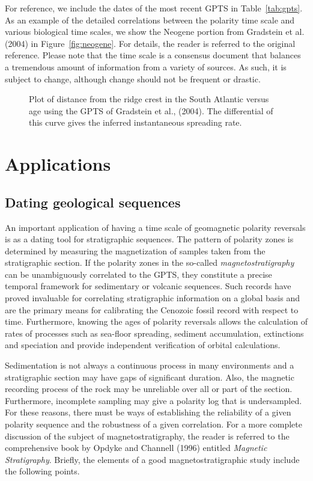 For reference, we include the dates of the most recent GPTS in Table~\ref{tab:gpts}.  As an example of the detailed correlations between the polarity time scale and various biological time scales, we show the Neogene portion from Gradstein et al. (2004) in Figure~\ref{fig:neogene}.    For details, the reader is referred to the original reference.  Please note that the time scale is a consensus document that balances a tremendous amount of information from a variety of sources.  As such, it is subject to change, although  change should not be frequent or drastic.   


\begin{figure}[htb]
\epsfxsize 10cm
\centering {}
\caption{Plot of distance from the ridge crest in the South Atlantic versus age using the GPTS of Gradstein et al., (2004).  The differential of this curve gives the inferred instantaneous spreading rate.}
\label{fig:spreadingrate}
\end{figure}

\section{Applications}

\subsection{Dating geological sequences}

An important application of having a time scale of geomagnetic polarity reversals is  as a dating tool for
stratigraphic sequences. The pattern of polarity zones is determined by
measuring
the magnetization of samples taken from the stratigraphic section.  If the polarity zones in the
so-called 
{\it magnetostratigraphy} can be
unambiguously correlated to the GPTS, 
they constitute a precise temporal framework
for sedimentary or volcanic sequences. Such records have proved invaluable
for correlating stratigraphic information on a global basis and are the
primary means for calibrating the Cenozoic fossil 
record with respect to time.   Furthermore, knowing the ages of polarity reversals allows the calculation of rates of processes such as sea-floor spreading, sediment accumulation,  extinctions and speciation and provide independent verification of orbital calculations.  




Sedimentation is not always a continuous process in many environments
and a stratigraphic section may  have gaps of significant duration.
Also, the magnetic recording process of the rock may be unreliable
over all or part of the section.  Furthermore, incomplete sampling may give a
polarity log that is undersampled.  For these reasons, there must be
ways of establishing the reliability of a given polarity sequence and
the robustness of a given correlation. For a more complete discussion of 
the subject of magnetostratigraphy, the reader is referred to the comprehensive
book by 
%
%
Opdyke and Channell (1996)  entitled {\it Magnetic Stratigraphy}. Briefly,
the elements of a good magnetostratigraphic study include the
following points.
\nocite{opdyke96}

